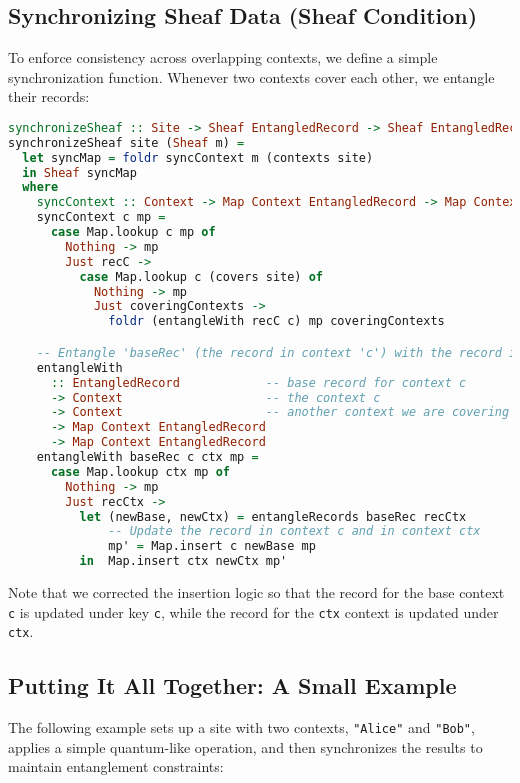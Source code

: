 \documentclass[11pt]{article}
\begin{document}
\subsection{Synchronizing Sheaf Data (Sheaf Condition)}
To enforce consistency across overlapping contexts, we define a simple synchronization function. Whenever two contexts cover each other, we entangle their records:

\begin{lstlisting}[language=Haskell, caption={Synchronizing local sections of a sheaf.}]
synchronizeSheaf :: Site -> Sheaf EntangledRecord -> Sheaf EntangledRecord
synchronizeSheaf site (Sheaf m) =
  let syncMap = foldr syncContext m (contexts site)
  in Sheaf syncMap
  where
    syncContext :: Context -> Map Context EntangledRecord -> Map Context EntangledRecord
    syncContext c mp =
      case Map.lookup c mp of
        Nothing -> mp
        Just recC ->
          case Map.lookup c (covers site) of
            Nothing -> mp
            Just coveringContexts ->
              foldr (entangleWith recC c) mp coveringContexts

    -- Entangle 'baseRec' (the record in context 'c') with the record in some other context 'ctx'.
    entangleWith
      :: EntangledRecord            -- base record for context c
      -> Context                    -- the context c
      -> Context                    -- another context we are covering
      -> Map Context EntangledRecord
      -> Map Context EntangledRecord
    entangleWith baseRec c ctx mp =
      case Map.lookup ctx mp of
        Nothing -> mp
        Just recCtx ->
          let (newBase, newCtx) = entangleRecords baseRec recCtx
              -- Update the record in context c and in context ctx
              mp' = Map.insert c newBase mp
          in  Map.insert ctx newCtx mp'
\end{lstlisting}

Note that we corrected the insertion logic so that the record for the base context \texttt{c} is updated under key \texttt{c}, while the record for the \texttt{ctx} context is updated under \texttt{ctx}.

\subsection{Putting It All Together: A Small Example}
The following example sets up a site with two contexts, \texttt{"Alice"} and \texttt{"Bob"}, applies a simple quantum-like operation, and then synchronizes the results to maintain entanglement constraints:
\end{document}
